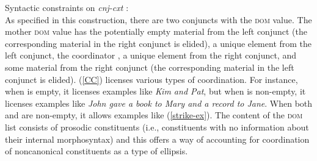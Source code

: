 \ea\label{CC}
Syntactic constraints on \emph{cnj-cxt} \citep[27]{Beavers2004}:\\
 \impl
{}
\z
%
%
%
%
As specified in this construction, there are two conjuncts with the \textsc{dom} value.
The mother \textsc{dom} value has the potentially empty material  from the left conjunct (the corresponding material in the right conjunct is elided), a unique element  from the left
conjunct, the coordinator , a unique element  from
the right conjunct, and some material  from the right 
conjunct (the corresponding material in the left conjunct is elided). (\ref{CC}) licenses various types of coordination. For instance, 
when  is empty, it licenses examples like
\emph{Kim and Pat}, but when  is non-empty, it licenses examples like \emph{John gave a book to Mary and a record
to Jane}. %
When
both  and  are non-empty, it allows examples 
like (\ref{strike-ex}). The content of the \textsc{dom} list consists of prosodic constituents (i.e., constituents with no information about their internal morphosyntax) and this offers a way of accounting for coordination of noncanonical constituents as a type of ellipsis.
 
%
 
